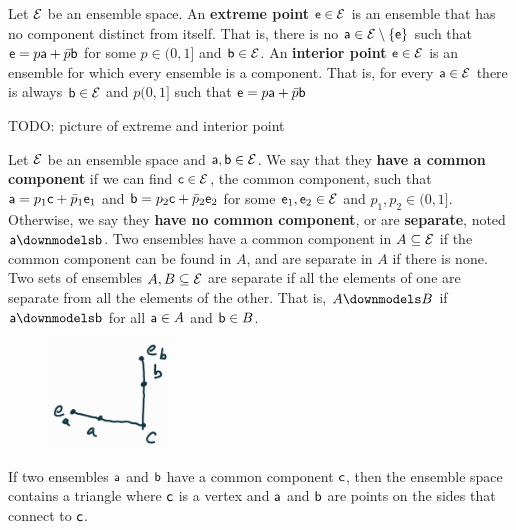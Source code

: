\begin{mathSection}
\begin{defn}
	Let $\Ens$ be an ensemble space. An \textbf{extreme point} $\ens \in \Ens$ is an ensemble that has no component distinct from itself. That is, there is no $\ens[a] \in \Ens\setminus\{ \ens \}$ such that $\ens = p \ens[a] + \bar{p} \ens[b]$ for some $p \in (0,1]$ and $\ens[b] \in \Ens$. An \textbf{interior point} $\ens \in \Ens$ is an ensemble for which every ensemble is a component. That is, for every $\ens[a] \in \Ens$ there is always $\ens[b] \in \Ens$ and $p(0,1]$ such that $\ens = p \ens[a] + \bar{p} \ens[b]$
\end{defn}

TODO: picture of extreme and interior point

\begin{defn}
	Let $\Ens$ be an ensemble space and $\ens[a], \ens[b] \in \Ens$. We say that they \textbf{have a common component} if we can find $\ens[c] \in \Ens$, the common component, such that $\ens[a] = p_1 \ens[c] + \bar{p}_1 \ens_1$ and $\ens[b] = p_2 \ens[c] + \bar{p}_2 \ens_2$ for some $\ens_1, \ens_2 \in \Ens$ and $p_1, p_2 \in (0,1]$. Otherwise, we say they \textbf{have no common component}, or are \textbf{separate}, noted $\ens[a] \separate \ens[b]$. Two ensembles have a common component in $A \subseteq \Ens$ if the common component can be found in $A$, and are separate in $A$ if there is none. Two sets of ensembles $A, B \subseteq \Ens$ are separate if all the elements of one are separate from all the elements of the other. That is, $A \separate B$ if $\ens[a] \separate \ens[b]$ for all $\ens[a] \in A$ and $\ens[b] \in B$.
\end{defn}

\begin{figure}[H]
	\centering
	\includegraphics[width=0.3\textwidth]{tempimages/CommonComponent.jpg}
\end{figure}

\begin{remark}
	If two ensembles $\ens[a]$ and $\ens[b]$ have a common component $\ens[c]$, then the ensemble space contains a triangle where $\ens[c]$ is a vertex and $\ens[a]$ and $\ens[b]$ are points on the sides that connect to $\ens[c]$.
\end{remark}


\end{mathSection}
